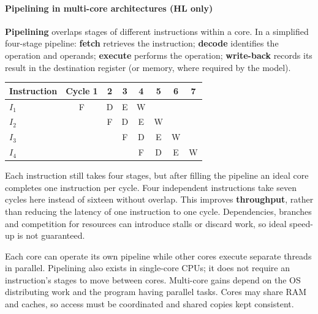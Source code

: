 \documentclass[a4paper,12pt]{article}
\begin{document}
\paragraph{Pipelining in multi-core architectures (HL only)}
\textbf{Pipelining} overlaps stages of different instructions within a core. In a simplified four-stage pipeline: \textbf{fetch} retrieves the instruction; \textbf{decode} identifies the operation and operands; \textbf{execute} performs the operation; \textbf{write-back} records its result in the destination register (or memory, where required by the model).
\begin{center}
\begin{tabular}{l c c c c c c c}
\toprule
Instruction & Cycle 1 & 2 & 3 & 4 & 5 & 6 & 7 \\
\midrule
$I_1$ & F & D & E & W & & & \\
$I_2$ & & F & D & E & W & & \\
$I_3$ & & & F & D & E & W & \\
$I_4$ & & & & F & D & E & W \\
\bottomrule
\end{tabular}
\end{center}
Each instruction still takes four stages, but after filling the pipeline an ideal core completes one instruction per cycle. Four independent instructions take seven cycles here instead of sixteen without overlap. This improves \textbf{throughput}, rather than reducing the latency of one instruction to one cycle. Dependencies, branches and competition for resources can introduce stalls or discard work, so ideal speed-up is not guaranteed.

Each core can operate its own pipeline while other cores execute separate threads in parallel. Pipelining also exists in single-core CPUs; it does not require an instruction's stages to move between cores. Multi-core gains depend on the OS distributing work and the program having parallel tasks. Cores may share RAM and caches, so access must be coordinated and shared copies kept consistent.
\end{document}

